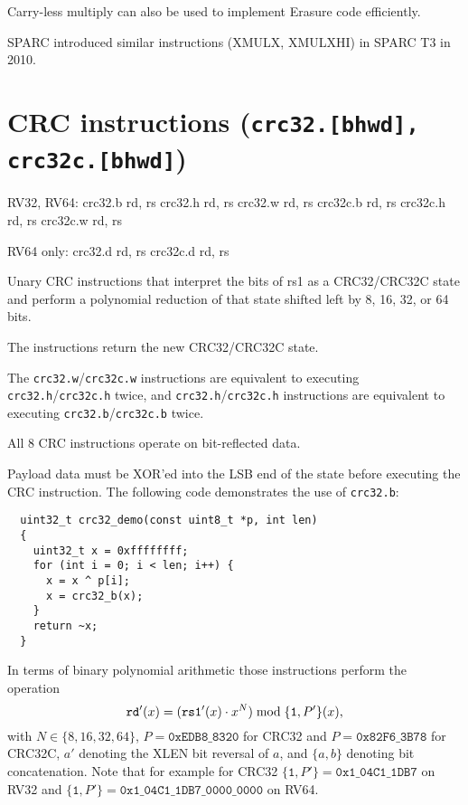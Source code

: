 Carry-less multiply can also be used to implement Erasure code efficiently.~\cite{ClmulErasureCode}

SPARC introduced similar instructions (XMULX, XMULXHI) in SPARC T3 in 2010.


\section{CRC instructions (\texttt{crc32.[bhwd], crc32c.[bhwd]})}

\begin{rvb}
  RV32, RV64:
    crc32.b rd, rs
    crc32.h rd, rs
    crc32.w rd, rs
    crc32c.b rd, rs
    crc32c.h rd, rs
    crc32c.w rd, rs

  RV64 only:
    crc32.d rd, rs
    crc32c.d rd, rs
\end{rvb}

Unary CRC instructions that interpret the bits of rs1 as a CRC32/CRC32C state
and perform a polynomial reduction of that state shifted left by 8, 16, 32, or
64 bits.

The instructions return the new CRC32/CRC32C state.

The \texttt{crc32.w}/\texttt{crc32c.w} instructions are equivalent to executing
\texttt{crc32.h}/\texttt{crc32c.h} twice, and \texttt{crc32.h}/\texttt{crc32c.h}
instructions are equivalent to executing \texttt{crc32.b}/\texttt{crc32c.b}
twice.

All 8 CRC instructions operate on bit-reflected data.



Payload data must be XOR'ed into the LSB end of the state before executing the
CRC instruction. The following code demonstrates the use of \texttt{crc32.b}:

\begin{minipage}{\linewidth}
\begin{verbatim}
  uint32_t crc32_demo(const uint8_t *p, int len)
  {
    uint32_t x = 0xffffffff;
    for (int i = 0; i < len; i++) {
      x = x ^ p[i];
      x = crc32_b(x);
    }
    return ~x;
  }
\end{verbatim}
\end{minipage}

In terms of binary polynomial arithmetic those instructions perform the operation
$$ \texttt{rd}'(x) = (\texttt{rs1}'(x) \cdot x^N) \; \textrm{mod} \; \{\texttt{1}, P'\}(x)\textrm, $$
with $N \in \{8, 16, 32, 64\}$,
$P = \texttt{0xEDB8\_8320}$ for CRC32 and $P = \texttt{0x82F6\_3B78}$ for CRC32C,
$a'$ denoting the XLEN bit reversal of $a$,
and $\{a, b\}$ denoting bit concatenation.
Note that for example for CRC32 $\{\texttt{1}, P'\} = \texttt{0x1\_04C1\_1DB7}$
on RV32 and $\{\texttt{1}, P'\} = \texttt{0x1\_04C1\_1DB7\_0000\_0000}$ on RV64.

